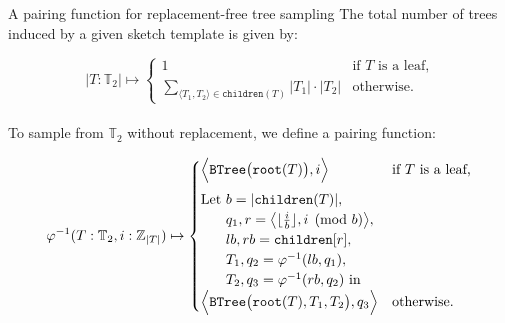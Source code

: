 \documentclass{beamer}
\begin{document}
\begin{frame}[fragile]{A pairing function for replacement-free tree sampling}
  The total number of trees induced by a given sketch template is given by:

  \begin{equation*}
    |T: \mathbb{T}_2| \mapsto \begin{cases}
                                1  & \text{if $T$ is a leaf,} \\
                                \sum_{\langle T_1, T_2\rangle \in \texttt{children}(T)} |T_1| \cdot |T_2| & \text{otherwise.}
    \end{cases}
  \end{equation*}\\

  To sample from $\mathbb{T}_2$ without replacement, we define a pairing function:

  \begin{equation*}
    \varphi^{-1}(T: \mathbb{T}_2, i: \mathbb{Z}_{|T|}) \mapsto \begin{cases}
                                                                 \Big\langle\texttt{BTree}\big(\texttt{root}(T)\big), i\Big\rangle & \text{if $T$ is a leaf,} \vspace{5pt}\\
                                                                 \text{Let } b = |\texttt{children}(T)|,\\
                                                                 \phantom{\text{Let }} q_1, r=\big\langle\lfloor\frac{i}{b}\rfloor, i \pmod{b}\big\rangle,\\
                                                                 \phantom{\text{Let }} lb, rb = \texttt{children}[r],\\
                                                                 \phantom{\text{Let }} T_1, q_2 = \varphi^{-1}(lb, q_1),\\
                                                                 \phantom{\text{Let }} T_2, q_3 = \varphi^{-1}(rb, q_2) \text{ in } \\
                                                                 \Big\langle\texttt{BTree}\big(\texttt{root}(T), T_1, T_2\big), q_3\Big\rangle & \text{otherwise.} \\
    \end{cases}
  \end{equation*}
\end{frame}
\end{document}

